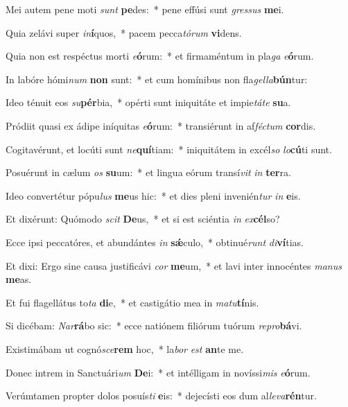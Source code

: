 \item Mei autem pene moti \textit{sunt} \textbf{pe}des:~* pene effúsi sunt \textit{gres}\textit{sus} \textbf{me}i.
\item Quia zelávi super \textit{in}\textbf{í}quos,~* pacem pecca\textit{tó}\textit{rum} \textbf{vi}dens.
\item Quia non est respéctus morti \textit{e}\textbf{ó}rum:~* et firmaméntum in pla\textit{ga} \textit{e}\textbf{ó}rum.
\item In labóre hómi\textit{num} \textbf{non} sunt:~* et cum homínibus non fla\textit{gel}\textit{la}\textbf{bún}tur:
\item Ideo ténuit eos \textit{su}\textbf{pér}bia,~* opérti sunt iniquitáte et impie\textit{tá}\textit{te} \textbf{su}a.
\item Pródiit quasi ex ádipe iníquitas \textit{e}\textbf{ó}rum:~* transiérunt in af\textit{féc}\textit{tum} \textbf{cor}dis.
\item Cogitavérunt, et locúti sunt \textit{ne}\textbf{quí}tiam:~* iniquitátem in excél\textit{so} \textit{lo}\textbf{cú}ti sunt.
\item Posuérunt in cælum \textit{os} \textbf{su}um:~* et lingua eórum transí\textit{vit} \textit{in} \textbf{ter}ra.
\item Ideo convertétur pópu\textit{lus} \textbf{me}us hic:~* et dies pleni invenién\textit{tur} \textit{in} \textbf{e}is.
\item Et dixérunt: Quómodo \textit{scit} \textbf{De}us,~* et si est sciéntia \textit{in} \textit{ex}\textbf{cél}so?
\item Ecce ipsi peccatóres, et abundántes \textit{in} \textbf{sǽ}culo,~* obtinué\textit{runt} \textit{di}\textbf{ví}tias.
\item Et dixi: Ergo sine causa justificávi \textit{cor} \textbf{me}um,~* et lavi inter innocéntes \textit{ma}\textit{nus} \textbf{me}as.
\item Et fui flagellátus to\textit{ta} \textbf{di}e,~* et castigátio mea in \textit{ma}\textit{tu}\textbf{tí}nis.
\item Si dicébam: \textit{Nar}\textbf{rá}bo sic:~* ecce natiónem filiórum tuórum \textit{re}\textit{pro}\textbf{bá}vi.
\item Existimábam ut cognó\textit{sce}\textbf{rem} hoc,~* la\textit{bor} \textit{est} \textbf{an}te me.
\item Donec intrem in Sanctuári\textit{um} \textbf{De}i:~* et intélligam in novíssi\textit{mis} \textit{e}\textbf{ó}rum.
\item Verúmtamen propter dolos posuís\textit{ti} \textbf{e}is:~* dejecísti eos dum al\textit{le}\textit{va}\textbf{rén}tur.
